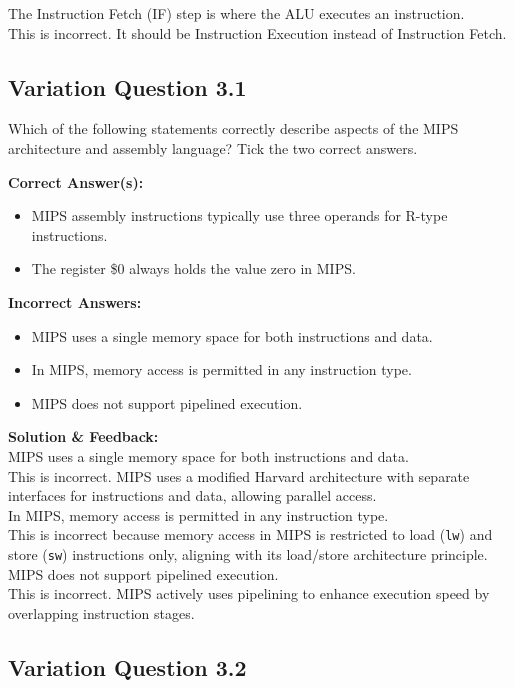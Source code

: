 The Instruction Fetch (IF) step is where the ALU executes an instruction.\\
This is incorrect. It should be Instruction Execution instead of Instruction Fetch.

\subsection{Variation Question 3.1}

Which of the following statements correctly describe aspects of the MIPS architecture and assembly language?
Tick the two correct answers.

\textbf{Correct Answer(s):}
\begin{itemize}
    \item MIPS assembly instructions typically use three operands for R-type instructions.
    \item The register \$0 always holds the value zero in MIPS.
\end{itemize}

\textbf{Incorrect Answers:}
\begin{itemize}
    \item MIPS uses a single memory space for both instructions and data.
    \item In MIPS, memory access is permitted in any instruction type.
    \item MIPS does not support pipelined execution.
\end{itemize}

\textbf{Solution \& Feedback:}\\
MIPS uses a single memory space for both instructions and data.\\
This is incorrect. MIPS uses a modified Harvard architecture with separate interfaces for instructions and data, allowing parallel access.\\

In MIPS, memory access is permitted in any instruction type.\\
This is incorrect because memory access in MIPS is restricted to load (\texttt{lw}) and store (\texttt{sw}) instructions only, aligning with its load/store architecture principle.\\

MIPS does not support pipelined execution.\\
This is incorrect. MIPS actively uses pipelining to enhance execution speed by overlapping instruction stages.

\subsection{Variation Question 3.2}

